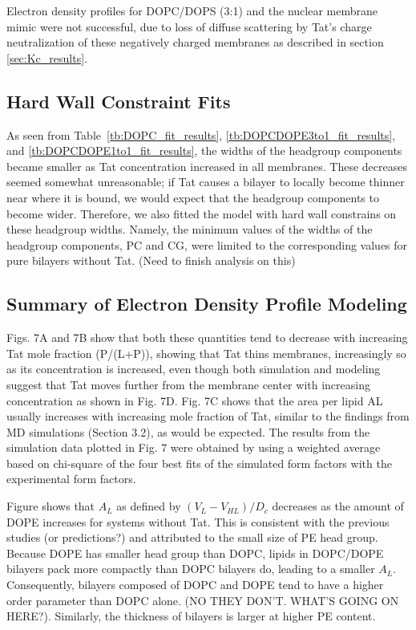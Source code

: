 Electron density profiles for DOPC/DOPS (3:1) and the nuclear membrane 
mimic were not
successful, due to loss of diffuse scattering by Tat’s charge neutralization 
of these negatively
charged membranes as described in section \ref{sec:Kc_results}.

\subsection{Hard Wall Constraint Fits}
As seen from Table~\ref{tb:DOPC_fit_results}, \ref{tb:DOPCDOPE3to1_fit_results},
and \ref{tb:DOPCDOPE1to1_fit_results}, the widths of the headgroup components
became smaller as Tat concentration increased in all membranes. These 
decreases seemed somewhat unreasonable; if Tat causes a bilayer 
to locally become thinner near where it is bound, 
we would expect that the headgroup components to become
wider. Therefore, we also fitted the model with hard wall constrains
on these headgroup widths. Namely, the minimum values of the widths of
the headgroup components, PC and CG, were limited to the corresponding 
values for pure bilayers without Tat. (Need to finish analysis on this)

\subsection{Summary of Electron Density Profile Modeling}
Figs. 7A and 7B show that both these 
quantities tend to
decrease with increasing Tat mole fraction (P/(L+P)), showing that Tat thins 
membranes,
increasingly so as its concentration is increased, even though both simulation 
and modeling
suggest that Tat moves further from the membrane center with increasing 
concentration as
shown in Fig. 7D. Fig. 7C shows that the area per lipid AL usually increases 
with increasing
mole fraction of Tat, similar to the findings from MD simulations (Section 3.2), 
as would be
expected. The results from the simulation data plotted in Fig. 7 were obtained 
by using a
weighted average based on chi-square of the four best fits of the simulated 
form factors with the
experimental form factors.

Figure shows that $A_L$ as defined by $(V_L-V_{HL})/D_c$ decreases as the 
amount of DOPE increases for systems without Tat. This is consistent with the
previous studies (or predictions?) and attributed to the small size of PE
head group. Because DOPE has smaller head group than DOPC, lipids in DOPC/DOPE
bilayers pack more compactly than DOPC bilayers do, leading to a smaller $A_L$.
Consequently, bilayers composed of DOPC and DOPE tend to have a higher order 
parameter than DOPC alone. (NO THEY DON'T. WHAT'S GOING ON HERE?). Similarly,
the thickness of bilayers is larger at higher PE content. 

